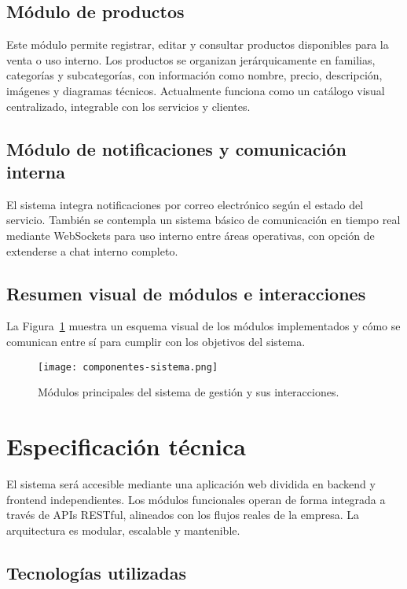 \subsection*{Módulo de productos}

Este módulo permite registrar, editar y consultar productos disponibles para la venta o uso interno. Los productos se organizan jerárquicamente en familias, categorías y subcategorías, con información como nombre, precio, descripción, imágenes y diagramas técnicos. Actualmente funciona como un catálogo visual centralizado, integrable con los servicios y clientes.

\subsection*{Módulo de notificaciones y comunicación interna}

El sistema integra notificaciones por correo electrónico según el estado del servicio. También se contempla un sistema básico de comunicación en tiempo real mediante WebSockets para uso interno entre áreas operativas, con opción de extenderse a chat interno completo.

\subsection*{Resumen visual de módulos e interacciones}

La Figura~\ref{fig:modulos} muestra un esquema visual de los módulos implementados y cómo se comunican entre sí para cumplir con los objetivos del sistema.

\begin{figure}[H]
	\centering
	\texttt{[image: componentes-sistema.png]}
	\caption{Módulos principales del sistema de gestión y sus interacciones.}
	\label{fig:modulos}
\end{figure}

	
\section{Especificación técnica}

El sistema será accesible mediante una aplicación web dividida en backend y frontend independientes. Los módulos funcionales operan de forma integrada a través de APIs RESTful, alineados con los flujos reales de la empresa. La arquitectura es modular, escalable y mantenible.

\subsection*{Tecnologías utilizadas}

